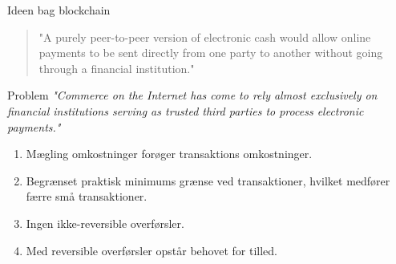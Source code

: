 \documentclass[12pt,t]{beamer}
\begin{document}
    \begin{frame}[c]{Ideen bag blockchain}
        \begin{quote}
            "A purely peer-to-peer version of electronic cash would allow online
            payments to be sent directly from one party to another without going through a
            financial institution." 
        \end{quote}
    \end{frame}

    \begin{frame}[plain]{}
	    \begin{block}{Problem}
	    \textit{"Commerce on the Internet has come to rely almost exclusively on financial institutions serving as trusted third parties to process electronic payments."}\\
	    \end{block}
    	\pause
        \begin{enumerate}        	
        	\item Mægling omkostninger forøger transaktions omkostninger. 
        	\item Begrænset praktisk minimums grænse ved transaktioner, hvilket medfører færre små transaktioner.
        	\item Ingen ikke-reversible overførsler. 
        	\item Med reversible overførsler opstår behovet for tilled.
        \end{enumerate}
    \end{frame}
\end{document}
